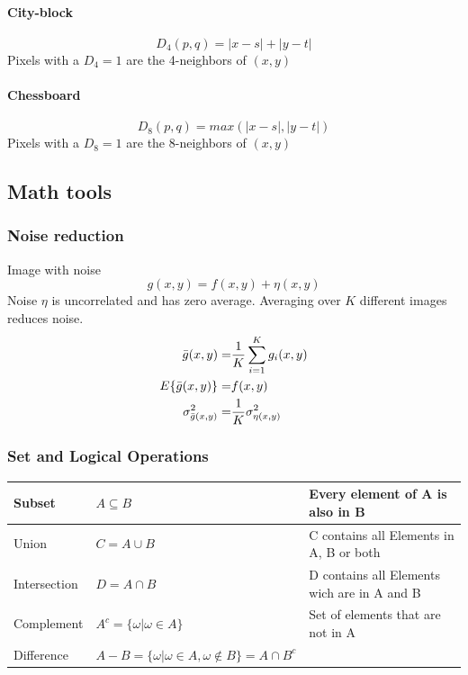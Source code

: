 \paragraph{City-block}
\begin{equation}
D_4(p,q) = |x-s| + |y-t|
\end{equation}
Pixels with a $D_4 = 1$ are the 4-neighbors of $(x,y)$
\paragraph{Chessboard}
\begin{equation}
D_8(p,q) = max(|x-s|, |y-t|)
\end{equation}
Pixels with a $D_8 = 1$ are the 8-neighbors of $(x,y)$

\subsection{Math tools }
\subsubsection{Noise reduction }
Image with noise
\begin{equation}
g(x,y) = f(x,y) + \eta(x,y)
\end{equation}
Noise $\eta$ is uncorrelated and has zero average.  Averaging over $K$ different images reduces noise.
\begin{eqnarray}
\bar{g}(x,y)      =& \frac{1}{K} \sum\limits_{i=1}^{K}g_i(x,y) \notag \\
E\{\bar{g}(x,y)\}   =& f(x,y) \\ 
\sigma_{\bar{g}(x,y)}^2 =& \frac{1}{K} \sigma_{\eta(x,y)}^2 \notag
\end{eqnarray}

\subsubsection{Set and Logical Operations }
\begin{tabular}{|l|l|l|}
  \hline
  Subset			& $A \subseteq B$						& Every element of A is also in B
  \\ \hline
  Union			& $C = A \cup B$						& C contains all Elements in A, B or both
  \\ \hline
  Intersection	& $D = A \cap B$						& D contains all Elements wich are in A and B
  \\ \hline
  Complement		& $A^c = \{ \omega | \omega \in A\}$	& Set of elements that are not in A
  \\ \hline
  Difference		& $A-B = \{ \omega | \omega \in A, \omega \notin B\} = A \cap B^c$	&
  \\ \hline
\end{tabular}


